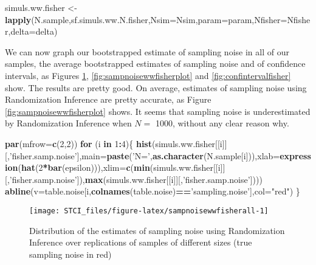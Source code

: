 \documentclass[]{book}
\newenvironment{Shaded}{\begin{snugshade}}{\end{snugshade}}
\newcommand{\ControlFlowTok}[1]{\textcolor[rgb]{0.13,0.29,0.53}{\textbf{#1}}}
\newcommand{\DataTypeTok}[1]{\textcolor[rgb]{0.13,0.29,0.53}{#1}}
\newcommand{\DecValTok}[1]{\textcolor[rgb]{0.00,0.00,0.81}{#1}}
\newcommand{\KeywordTok}[1]{\textcolor[rgb]{0.13,0.29,0.53}{\textbf{#1}}}
\newcommand{\NormalTok}[1]{#1}
\newcommand{\OperatorTok}[1]{\textcolor[rgb]{0.81,0.36,0.00}{\textbf{#1}}}
\newcommand{\StringTok}[1]{\textcolor[rgb]{0.31,0.60,0.02}{#1}}
\theoremstyle{definition}
\theoremstyle{definition}
\theoremstyle{definition}
\theoremstyle{remark}
\begin{document}
\begin{Shaded}
\begin{Highlighting}[]
\NormalTok{simuls.ww.fisher <-}\StringTok{ }\KeywordTok{lapply}\NormalTok{(N.sample,sf.simuls.ww.N.fisher,}\DataTypeTok{Nsim=}\NormalTok{Nsim,}\DataTypeTok{param=}\NormalTok{param,}\DataTypeTok{Nfisher=}\NormalTok{Nfisher,}\DataTypeTok{delta=}\NormalTok{delta)}
\end{Highlighting}
\end{Shaded}

We can now graph our bootstrapped estimate of sampling noise in all of our samples, the average bootstrapped estimates of sampling noise and of confidence intervals, as Figures \ref{fig:sampnoisewwfisherall}, \ref{fig:sampnoisewwfisherplot} and \ref{fig:confintervalfisher} show.
The results are pretty good.
On average, estimates of sampling noise using Randomization Inference are pretty accurate, as Figure \ref{fig:sampnoisewwfisherplot} shows.
It seems that sampling noise is underestimated by Randomization Inference when \(N=\) 1000, without any clear reason why.

\begin{Shaded}
\begin{Highlighting}[]
\KeywordTok{par}\NormalTok{(}\DataTypeTok{mfrow=}\KeywordTok{c}\NormalTok{(}\DecValTok{2}\NormalTok{,}\DecValTok{2}\NormalTok{))}
\ControlFlowTok{for}\NormalTok{ (i }\ControlFlowTok{in} \DecValTok{1}\OperatorTok{:}\DecValTok{4}\NormalTok{)\{}
  \KeywordTok{hist}\NormalTok{(simuls.ww.fisher[[i]][,}\StringTok{'fisher.samp.noise'}\NormalTok{],}\DataTypeTok{main=}\KeywordTok{paste}\NormalTok{(}\StringTok{'N='}\NormalTok{,}\KeywordTok{as.character}\NormalTok{(N.sample[i])),}\DataTypeTok{xlab=}\KeywordTok{expression}\NormalTok{(}\KeywordTok{hat}\NormalTok{(}\DecValTok{2}\OperatorTok{*}\KeywordTok{bar}\NormalTok{(epsilon))),}\DataTypeTok{xlim=}\KeywordTok{c}\NormalTok{(}\KeywordTok{min}\NormalTok{(simuls.ww.fisher[[i]][,}\StringTok{'fisher.samp.noise'}\NormalTok{]),}\KeywordTok{max}\NormalTok{(simuls.ww.fisher[[i]][,}\StringTok{'fisher.samp.noise'}\NormalTok{])))}
  \KeywordTok{abline}\NormalTok{(}\DataTypeTok{v=}\NormalTok{table.noise[i,}\KeywordTok{colnames}\NormalTok{(table.noise)}\OperatorTok{==}\StringTok{'sampling.noise'}\NormalTok{],}\DataTypeTok{col=}\StringTok{"red"}\NormalTok{)}
\NormalTok{\}}
\end{Highlighting}
\end{Shaded}

\begin{figure}[htbp]

{\centering \texttt{[image: STCI\_files/figure-latex/sampnoisewwfisherall-1]} 

}

\caption{Distribution of the estimates of sampling noise using Randomization Inference over replications of samples of different sizes (true sampling noise in red)}\label{fig:sampnoisewwfisherall}
\end{figure}
\end{document}
